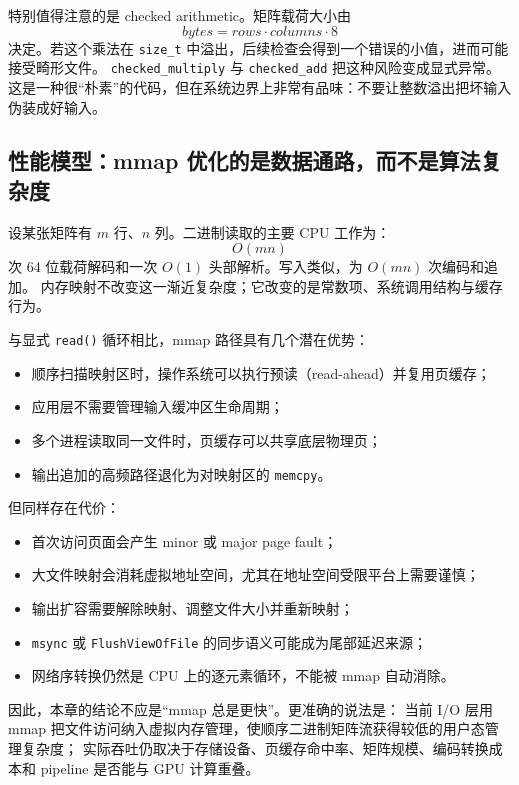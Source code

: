 特别值得注意的是 checked arithmetic。矩阵载荷大小由
\[
    bytes = rows\cdot columns\cdot 8
\]
决定。若这个乘法在 \texttt{size\_t} 中溢出，后续检查会得到一个错误的小值，进而可能接受畸形文件。
\texttt{checked\_multiply} 与 \texttt{checked\_add} 把这种风险变成显式异常。
这是一种很“朴素”的代码，但在系统边界上非常有品味：不要让整数溢出把坏输入伪装成好输入。

\subsection{性能模型：mmap 优化的是数据通路，而不是算法复杂度}

设某张矩阵有 $m$ 行、$n$ 列。二进制读取的主要 CPU 工作为：
\[
    O(mn)
\]
次 $64$ 位载荷解码和一次 $O(1)$ 头部解析。写入类似，为 $O(mn)$ 次编码和追加。
内存映射不改变这一渐近复杂度；它改变的是常数项、系统调用结构与缓存行为。

与显式 \texttt{read()} 循环相比，mmap 路径具有几个潜在优势：

\begin{itemize}
    \item 顺序扫描映射区时，操作系统可以执行预读（read-ahead）并复用页缓存；
    \item 应用层不需要管理输入缓冲区生命周期；
    \item 多个进程读取同一文件时，页缓存可以共享底层物理页；
    \item 输出追加的高频路径退化为对映射区的 \texttt{memcpy}。
\end{itemize}

但同样存在代价：

\begin{itemize}
    \item 首次访问页面会产生 minor 或 major page fault；
    \item 大文件映射会消耗虚拟地址空间，尤其在地址空间受限平台上需要谨慎；
    \item 输出扩容需要解除映射、调整文件大小并重新映射；
    \item \texttt{msync} 或 \texttt{FlushViewOfFile} 的同步语义可能成为尾部延迟来源；
    \item 网络序转换仍然是 CPU 上的逐元素循环，不能被 mmap 自动消除。
\end{itemize}

因此，本章的结论不应是“mmap 总是更快”。更准确的说法是：
当前 I/O 层用 mmap 把文件访问纳入虚拟内存管理，使顺序二进制矩阵流获得较低的用户态管理复杂度；
实际吞吐仍取决于存储设备、页缓存命中率、矩阵规模、编码转换成本和 pipeline 是否能与 GPU 计算重叠。

